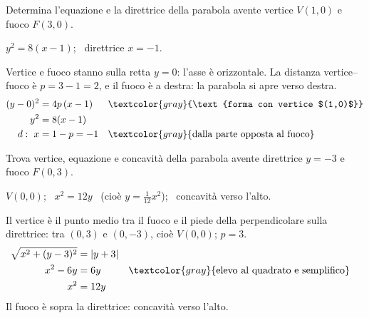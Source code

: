 
\begin{question}[ID=1.6, subtitle={Parabola con vertice $V(1,0)$ e fuoco $F(3,0)$}, difficulty=media, tags={parabola}]
Determina l'equazione e la direttrice della parabola avente vertice $V(1,0)$ e fuoco $F(3,0)$.
\begin{solution}
$y^2=8(x-1)$; \ direttrice $x=-1$.
\end{solution}
\begin{explanation}
Vertice e fuoco stanno sulla retta $y=0$: l'asse è orizzontale. La distanza vertice–fuoco è $p=3-1=2$, e il fuoco è a destra: la parabola si apre verso destra.
\[\begin{aligned}
(y-0)^2 &= 4p\,(x-1) && \textcolor{gray}{\text{forma con vertice $(1,0)$}}\\
y^2 &= 8(x-1)\\
d:\ x &= 1-p=-1 && \textcolor{gray}{\text{dalla parte opposta al fuoco}}
\end{aligned}\]
\end{explanation}
\end{question}


\begin{question}[ID=1.7, subtitle={Parabola con direttrice $y=-3$ e fuoco $F(0,3)$}, difficulty=media, tags={parabola}]
Trova vertice, equazione e concavità della parabola avente direttrice $y=-3$ e fuoco $F(0,3)$.
\begin{solution}
$V(0,0)$; \ $x^2=12y$ \ (cioè $y=\tfrac{1}{12}x^2$); \ concavità verso l'alto.
\end{solution}
\begin{explanation}
Il vertice è il punto medio tra il fuoco e il piede della perpendicolare sulla direttrice: tra $(0,3)$ e $(0,-3)$, cioè $V(0,0)$; $p=3$.
\[\begin{aligned}
\sqrt{x^2+(y-3)^2} &= |y+3|\\
x^2-6y &= 6y && \textcolor{gray}{\text{elevo al quadrato e semplifico}}\\
x^2 &= 12y
\end{aligned}\]
Il fuoco è sopra la direttrice: concavità verso l'alto.
\end{explanation}
\end{question}


